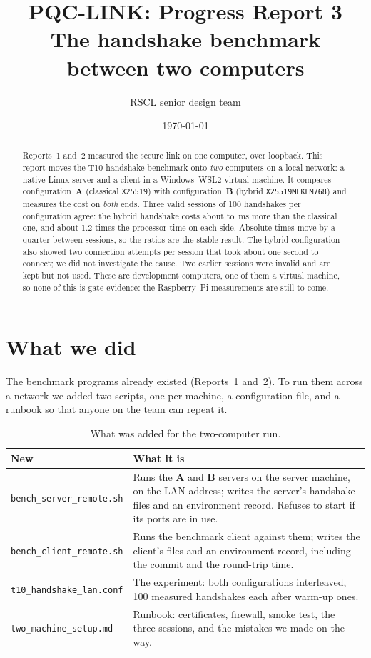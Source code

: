 \documentclass[11pt,a4paper]{article}
\title{\textbf{PQC-LINK: Progress Report 3}\\[2pt]
       \large The handshake benchmark between two computers}
\author{RSCL senior design team}
\date{\today}
\newcommand{\prog}[1]{\texttt{#1}}
\newcommand{\cA}{\textcolor{colorA}{\textbf{A}}}
\newcommand{\cB}{\textcolor{colorB}{\textbf{B}}}
\begin{document}
\maketitle

\begin{abstract}
\noindent Reports~1 and~2 measured the secure link on one computer, over loopback. This report
moves the T10 handshake benchmark onto \emph{two} computers on a local network: a native Linux
server and a client in a Windows~WSL2 virtual machine. It compares configuration~\cA{}
(classical \prog{X25519}) with configuration~\cB{} (hybrid \prog{X25519MLKEM768}) and measures
the cost on \emph{both} ends. Three valid sessions of 100 handshakes per configuration agree: the
hybrid handshake costs about \TlsDiffThree{} to \TlsDiffOne{}\,ms more than the classical one, and
about 1.2 times the processor time on each side. Absolute times move by a quarter between sessions,
so the ratios are the stable result. The hybrid configuration also showed two connection attempts
per session that took about one second to connect; we did not investigate the cause. Two earlier
sessions were invalid and are kept but not used. These are development computers, one of them a
virtual machine, so none of this is gate evidence: the Raspberry~Pi measurements are still to come.
\end{abstract}

\section{What we did}

The benchmark programs already existed (Reports~1 and~2). To run them across a network we added two
scripts, one per machine, a configuration file, and a runbook so that anyone on the team can repeat it.

\begin{table}[!htbp]
\centering
\begin{tabularx}{\linewidth}{@{}lX@{}}
\toprule
\textbf{New} & \textbf{What it is}\\
\midrule
\prog{bench\_server\_remote.sh} & Runs the \cA{} and \cB{} servers on the server machine, on the LAN
  address; writes the server's handshake files and an environment record. Refuses to start if its
  ports are in use.\\
\prog{bench\_client\_remote.sh} & Runs the benchmark client against them; writes the client's files
  and an environment record, including the commit and the round-trip time.\\
\prog{t10\_handshake\_lan.conf} & The experiment: both configurations interleaved, 100 measured
  handshakes each after \NWarm{} warm-up ones.\\
\prog{two\_machine\_setup.md} & Runbook: certificates, firewall, smoke test, the three sessions, and
  the mistakes we made on the way.\\
\bottomrule
\end{tabularx}
\caption{What was added for the two-computer run.}
\end{table}
\end{document}
